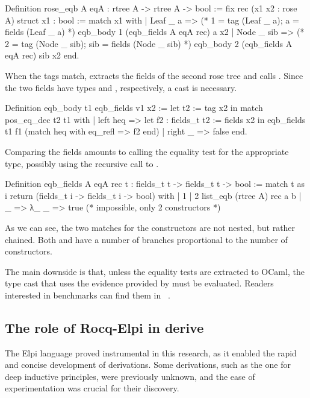 \documentclass[a4paper, 11pt]{book}
\begin{document}
\begin{rocqcode}
Definition rose_eqb A eqA : rtree A -> rtree A -> bool := 
  fix rec (x1 x2 : rose A) {struct x1} : bool :=
    match x1 with
    | Leaf _ a =>
        (* 1 = tag (Leaf _ a); a = fields (Leaf _ a) *)
        eqb_body 1 (eqb_fields A eqA rec) a x2
    | Node _ sib =>            
        (* 2 = tag (Node _ sib); sib = fields (Node _ sib) *)
        eqb_body 2 (eqb_fields A eqA rec) sib x2
    end.
\end{rocqcode}


When the tags match,  extracts the fields of the second rose
tree and calls . Since the two fields have types
 and , respectively, a cast is necessary.

\begin{rocqcode}
Definition eqb_body t1 eqb_fields v1 x2 :=
  let t2 := tag x2 in
  match pos_eq_dec t2 t1 with
  | left heq =>
    let f2 : fields_t t2 := fields x2 in
    eqb_fields t1 f1 (match heq with eq_refl => f2 end)
  | right _ => false
  end.
\end{rocqcode}

Comparing the fields amounts to calling the equality test for the appropriate
type, possibly using the recursive call to .

\begin{rocqcode}
Definition eqb_fields A eqA rec t :
  fields_t t -> fields_t t -> bool
:=
  match t as i return (fields_t i -> fields_t i -> bool) with
  | 1%
  | 2%
                    list_eqb (rtree A) rec a b
  | _ => λ_ _ => true (* impossible, only 2 constructors *)
\end{rocqcode}

As we can see, the two matches for the constructors are not nested, but rather
chained. Both  and  have a number of branches
proportional to the number of constructors.


The main downside is that, unless the equality tests are extracted to OCaml,
the type cast that uses the evidence provided by  must be
evaluated. Readers interested in benchmarks can find them in
~\cite{gregoire:hal-03800154}.

\subsection{The role of Rocq-Elpi in derive}
The Elpi language proved instrumental in this research, as it enabled the
rapid and concise development of derivations. Some derivations, such as the one
for deep inductive principles, were previously unknown, and the ease of
experimentation was crucial for their discovery.
\end{document}
